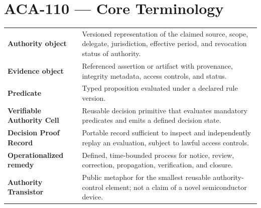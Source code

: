 \chapter{ACA-110 --- Core Terminology}
\begin{longtable}{>{\bfseries}p{}p{}}
Authority object & Versioned representation of the claimed source, scope, delegate, jurisdiction, effective period, and revocation status of authority.\\
Evidence object & Referenced assertion or artifact with provenance, integrity metadata, access controls, and status.\\
Predicate & Typed proposition evaluated under a declared rule version.\\
Verifiable Authority Cell & Reusable decision primitive that evaluates mandatory predicates and emits a defined decision state.\\
Decision Proof Record & Portable record sufficient to inspect and independently replay an evaluation, subject to lawful access controls.\\
Operationalized remedy & Defined, time-bounded process for notice, review, correction, propagation, verification, and closure.\\
Authority Transistor & Public metaphor for the smallest reusable authority-control element; not a claim of a novel semiconductor device.\\
\end{longtable}
